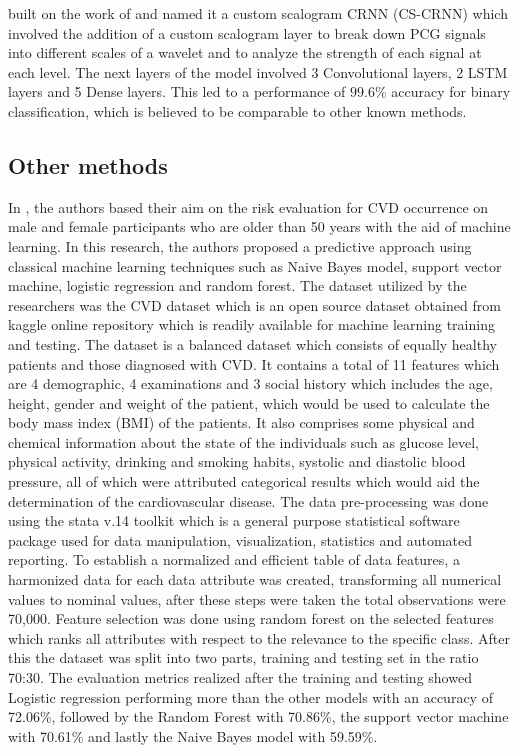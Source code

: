 \documentclass[12pt, a4paper,twoside]{report}
\numberwithin{equation}{chapter}
\begin{document}
\parencite{10409163} built on the work of \parencite{shuvo} and named it a custom scalogram CRNN (CS-CRNN) which involved the addition of a custom scalogram layer to break down PCG signals into different scales of a wavelet and to analyze the strength of each signal at each level. The next layers of the model involved 3 Convolutional layers, 2 LSTM layers and 5 Dense layers. This led to a performance of $99.6\%$ accuracy for binary classification, which is believed to be comparable to other known methods.

\subsection{Other methods}
In \cite{dritsas2022cardiovascular}, the authors based their aim on the risk evaluation for CVD occurrence on male and female participants who are older than 50 years with the aid of machine learning. In this research, the authors proposed a predictive approach using classical machine learning techniques such as Naive Bayes model, support vector machine, logistic regression and random forest. The dataset utilized by the researchers was the CVD dataset which is an open source dataset obtained from kaggle online repository which is readily available for machine learning training and testing. The dataset is a balanced dataset which consists of equally healthy patients and those diagnosed with CVD. It contains a total of 11 features which are 4 demographic, 4 examinations and 3 social history which includes the age, height, gender and weight of the patient, which would be used to calculate the body mass index (BMI) of the patients. It also comprises some physical and chemical information about the state of the individuals such as glucose level, physical activity, drinking and smoking habits, systolic and diastolic blood pressure, all of which were attributed categorical results which would aid the determination of the cardiovascular disease. The data pre-processing was done using the stata v.14 toolkit which is a general purpose statistical software package used for data manipulation, visualization, statistics and automated reporting. To establish a normalized and efficient table of data features, a harmonized data for each data attribute was created, transforming all numerical values to nominal values, after these steps were taken the total observations were 70,000. Feature selection was done using random forest on the selected features which ranks all attributes with respect to the relevance to the specific class. After this the dataset was split into two parts, training and testing set in the ratio 70:30. The evaluation metrics realized after the training and testing showed Logistic regression performing more than the other models with an accuracy of 72.06\%, followed by the Random Forest with 70.86\%, the support vector machine with 70.61\% and lastly the Naive Bayes model with 59.59\%.
\end{document}
